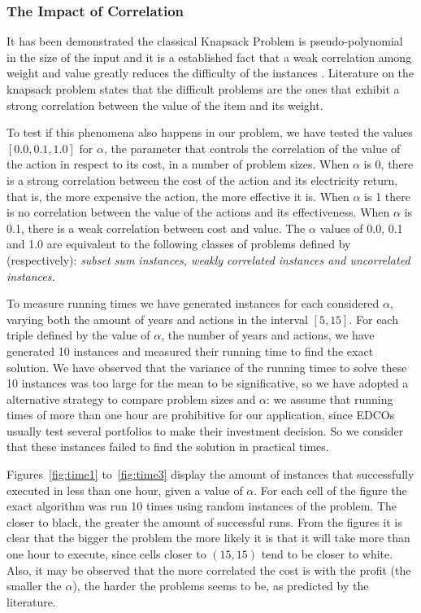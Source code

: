 \subsubsection{The Impact of Correlation}                      
It has been demonstrated the classical  Knapsack Problem is pseudo-polynomial
in the size of the input \cite{garey1978} and it is a established
fact that a weak correlation among weight and value greatly reduces the difficulty of the instances \cite{david2005}.
Literature on the knapsack problem states that the difficult problems are the ones that exhibit 
a strong correlation between the value of the item and its weight.

To test if this phenomena also happens in our problem, we have tested the values $[0.0, 0.1, 1.0]$ for $\alpha$,
the parameter that controls the correlation of the value of the action in respect to its cost, 
in a number of problem sizes. When $\alpha$ is 0,
there is a strong correlation between the cost of the action and its electricity return, that is,
the more expensive the action, the more effective it is. When $\alpha$ is 1 there is no correlation
between the value of the actions and its effectiveness. When $\alpha$ is 0.1, there is a weak correlation between cost and value.
The $\alpha$ values of 0.0, 0.1 and 1.0 are equivalent to the following classes of problems defined by \cite{david2005} (respectively): 
\textit{subset sum instances, weakly correlated instances and uncorrelated instances.}

To measure running times we have generated instances for each considered $\alpha$, varying both the amount of years and actions
in the interval $[5,15]$. For each triple defined by the value of $\alpha$, the number of years and actions,
we have generated 10 instances and measured their running time to find the exact solution. 
We have observed that the variance of the running times to solve these 10 instances was too large
for the mean to be significative, so we have adopted a alternative strategy to compare problem sizes
and $\alpha$:
we assume that running times of more than one hour are prohibitive for our application, since
EDCOs usually test several portfolios to make their investment decision. So we consider that
these instances failed to find the solution in practical times.

Figures~\ref{fig:time1} to~\ref{fig:time3} display the amount of instances that successfully executed in less than one hour,
given a value of $\alpha$. For each cell of the figure the exact algorithm was run 10 times using random instances of the problem.
The closer to black, the greater the amount of successful runs. 
From the figures it is clear that the bigger the problem the more likely it is that it will take more than one hour to execute, 
since cells closer to $(15,15)$ tend to be closer to white.
Also, it may be observed that the more
correlated the cost is with the profit (the smaller the $\alpha$),
the harder the problems seems to be, as predicted by the literature.

